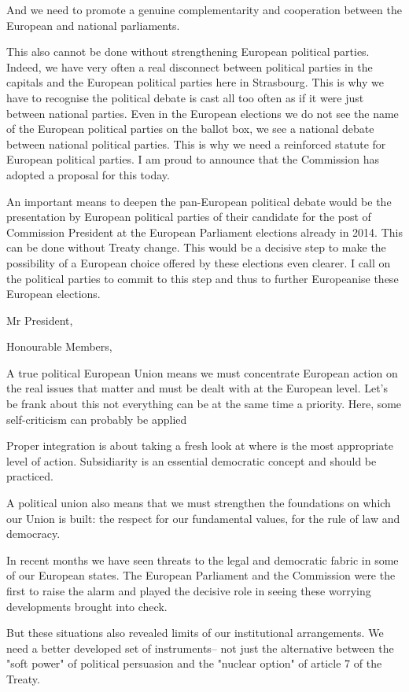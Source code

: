 \documentclass[a4paper,11pt]{article}
\begin{document}
And we need to promote a genuine complementarity and cooperation between the European and national parliaments.

This also cannot be done without strengthening European political parties. Indeed, we have very often a real disconnect between political parties in the capitals and the European political parties here in Strasbourg. This is why we have to recognise the political debate is cast all too often as if it were just between national parties. Even in the European elections we do not see the name of the European political parties on the ballot box, we see a national debate between national political parties. This is why we need a reinforced statute for European political parties. I am proud to announce that the Commission has adopted a proposal for this today.

An important means to deepen the pan-European political debate would be the presentation by European political parties of their candidate for the post of Commission President at the European Parliament elections already in 2014. This can be done without Treaty change. This would be a decisive step to make the possibility of a European choice offered by these elections even clearer. I call on the political parties to commit to this step and thus to further Europeanise these European elections.

Mr President,

Honourable Members,

A true political European Union means we must concentrate European action on the real issues that matter and must be dealt with at the European level. Let's be frank about this not everything can be at the same time a priority. Here, some self-criticism can probably be applied

Proper integration is about taking a fresh look at where is the most appropriate level of action. Subsidiarity is an essential democratic concept and should be practiced.

A political union also means that we must strengthen the foundations on which our Union is built: the respect for our fundamental values, for the rule of law and democracy.

In recent months we have seen threats to the legal and democratic fabric in some of our European states. The European Parliament and the Commission were the first to raise the alarm and played the decisive role in seeing these worrying developments brought into check.

But these situations also revealed limits of our institutional arrangements. We need a better developed set of instruments– not just the alternative between the "soft power" of political persuasion and the "nuclear option" of article 7 of the Treaty.
\end{document}
